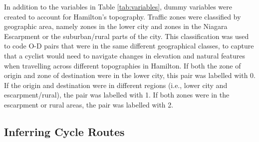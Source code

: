 \documentclass[smallextended]{svjour3}       %
\begin{document}
In addition to the variables in Table \ref{tab:variables}, dummy
variables were created to account for Hamilton's topography. Traffic
zones were classified by geographic area, namely zones in the lower city
and zones in the Niagara Escarpment or the suburban/rural parts of the
city. This classification was used to code O-D pairs that were in the
same different geographical classes, to capture that a cyclist would
need to navigate changes in elevation and natural features when
travelling across different topographies in Hamilton. If both the zone
of origin and zone of destination were in the lower city, this pair was
labelled with 0. If the origin and destination were in different regions
(i.e., lower city and escarpment/rural), the pair was labelled with 1.
If both zones were in the escarpment or rural areas, the pair was
labelled with 2.

\hypertarget{inferring-cycle-routes}{%
\subsection{Inferring Cycle Routes}\label{inferring-cycle-routes}}
\end{document}
